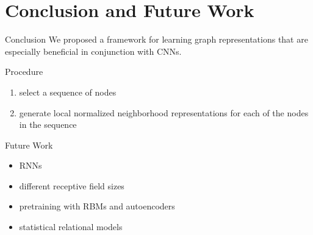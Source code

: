 \documentclass[dvipdfmx]{beamer}
\begin{document}
\section{Conclusion and Future Work}

  \begin{frame}{Conclusion}
    \alert{\Large We proposed a framework for learning graph representations that are especially beneficial in conjunction with CNNs.}
    \vspace{5mm}

    \begin{block}{Procedure}
      \begin{enumerate}
        \item select a sequence of nodes
        \item generate local normalized neighborhood representations for each of the nodes in the sequence
      \end{enumerate}
    \end{block}
  \end{frame}

  \begin{frame}{Future Work}
    \begin{itemize}
      \item RNNs
      \item different receptive field sizes
      \item pretraining with RBMs and autoencoders
      \item statistical relational models
    \end{itemize}
  \end{frame}
\end{document}
